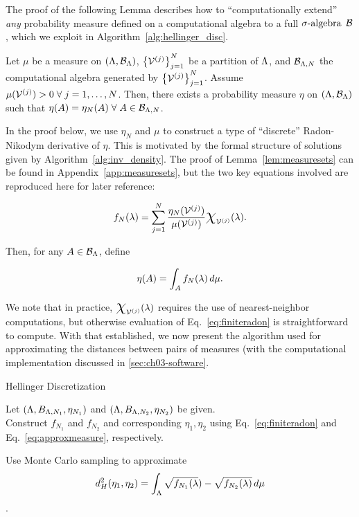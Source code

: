 The proof of the following Lemma describes how to ``computationally extend'' {\em any} probability measure defined on a computational algebra to a full $\sigma\text{-algebra}$ $\mathcal{B}$, which we exploit in Algorithm~\ref{alg:hellinger_disc}.
\begin{lem}
\label{lem:measuresets}
Let $\mu$ be a measure on $({\Lambda}, \mathcal{B}_{\Lambda})$, $\left\{\mathcal{V}^{(j)}\right\}_{j=1}^{N}$ be a partition of ${\Lambda}$, and $\mathcal{B}_{{\Lambda}, N}$ the computational algebra generated by $\left\{\mathcal{V}^{(j)}\right\}_{j=1}^{N}$.
Assume $\mu (\mathcal{V}^{(j)}) > 0 \; \forall \; j=1,\hdots, N$.
Then, there exists a probability measure $\eta$ on $({\Lambda}, \mathcal{B}_{\Lambda})$ such that $\eta(A) = \eta_N(A) \; \forall \; A\in\mathcal{B}_{{\Lambda}, N}$.
\end{lem}
In the proof below, we use $\eta_N$ and $\mu$ to construct a type of ``discrete'' Radon-Nikodym derivative of $\eta$.
This is motivated by the formal structure of solutions given by Algorithm~\ref{alg:inv_density}.
The proof of Lemma~\ref{lem:measuresets} can be found in Appendix~\ref{app:measuresets}, but the two key equations involved are reproduced here for later reference:

\begin{equation}\label{eq:finiteradon}
f_N (\param) = \sum_{j=1}^{N} \frac{\eta_N (\VV^{(j)}) }{\mu (\VV^{(j)})} \Chi_{\VV^{(j)}} (\param).
\end{equation}

Then, for any $A\in\mathcal{B}_{\Lambda}$, define

\begin{equation}\label{eq:approxmeasure}
\eta (A) = \int_A f_N (\lambda) \, d\mu.
\end{equation}

We note that in practice, $\Chi_{\VV^{(j)}} (\param)$ requires the use of nearest-neighbor computations, but otherwise evaluation of Eq.~\eqref{eq:finiteradon} is straightforward to compute.
With that established, we now present the algorithm used for approximating the distances between pairs of measures (with the computational implementation discussed in \ref{sec:ch03-software}.


\begin{algorithm}
\DontPrintSemicolon
\caption{Hellinger Discretization}
\label{alg:hellinger_disc}
Let $({\Lambda}, B_{{\Lambda}, N_1}, \eta_{N_1} )$ and $({\Lambda}, B_{{\Lambda}, N_2}, \eta_{N_2} )$ be given.\\

Construct $f_{N_1}$ and $f_{N_2}$ and corresponding $\eta_1, \eta_2$ using Eq.~\eqref{eq:finiteradon} and Eq.~\eqref{eq:approxmeasure}, respectively.

Use Monte Carlo sampling to approximate
$$ d^2_H(\eta_1, \eta_2) = \int_{\Lambda} \sqrt{f_{N_1}(\lambda}) - \sqrt{f_{N_2}(\lambda)} \, d\mu $$.
\end{algorithm}

